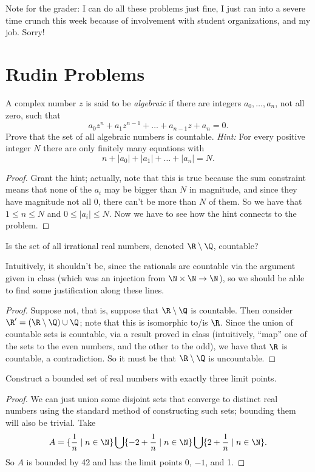 \documentclass{assignment}
\begin{document}

Note for the grader: I can do all these problems just fine, I just ran into a severe time crunch this
week because of involvement with student organizations, and my job. Sorry!

\section*{Rudin Problems}
\begin{question}[2]
  A complex number $z$ is said to be \emph{algebraic} if there are integers $a_0,\dots,a_n$, not all
zero, such that $$a_0z^n + a_1z^{n-1} + \dots + a_{n-1}z + a_n = 0.$$ Prove that the set of all 
algebraic numbers is countable. \emph{Hint:} For every positive integer $N$ there are only finitely 
many equations with $$n + |a_0| + |a_1| + \dots + |a_n| = N.$$
\end{question}
\begin{proof}
  Grant the hint; actually, note that this is true because the sum constraint means that none of the
  $a_i$ may be bigger than $N$ in magnitude, and since they have magnitude not all 0, there can't 
  be more than $N$ of them. So we have that $1 \leq n \leq N$ and $0 \leq |a_i| \leq N$. Now we have 
  to see how the hint connects to the problem.
  \end{proof}

\begin{question}[4]
  Is the set of all irrational real numbers, denoted $\R\setminus\Q$, countable?
\end{question}
  Intuitively, it shouldn't be, since the rationals are countable via the argument given in class 
(which was an injection from $\N\times\N\to\N$), so we should be able to find some justification 
along these lines.
\begin{proof}
Suppose not, that is, suppose that $\R \setminus \Q$ is countable. Then consider $\R' = (\R \setminus
\Q) \cup \Q$; note that this is isomorphic to/is $\R$. Since the union of countable sets is countable,
via a result proved in class (intuitively, ``map'' one of the sets to the even numbers, and the other
to the odd), we have that $\R$ is countable, a contradiction. So it must be that $\R\setminus\Q$ is
uncountable.
\end{proof}

\begin{question}[5]
  Construct a bounded set of real numbers with exactly three limit points.
\end{question}
\begin{proof}
  We can just union some disjoint sets that converge to distinct real numbers using the standard method
of constructing such sets; bounding them will also be trivial. Take $$A = \{\frac{1}{n} \mid n\in\N\}
\bigcup \{-2 + \frac{1}{n} \mid n\in\N\} \bigcup \{2 + \frac{1}{n} \mid n\in\N \}.$$ So $A$ is bounded
 by 42 and has the limit points 0, $-1$, and 1.
\end{proof}
\end{document}
